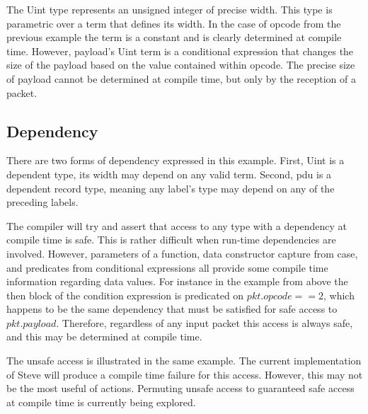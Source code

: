 The Uint type represents an unsigned integer of precise width. This type is 
parametric over a term that defines its width. In the case of opcode from the
previous example the term is a constant and is clearly determined at compile
time. However, payload's Uint term is a conditional expression that changes
the size of the payload based on the value contained within opcode. The precise
size of payload cannot be determined at compile time, but only by the reception
of a packet.

\subsection{Dependency}

There are two forms of dependency expressed in this example. First, Uint is a 
dependent type, its width may depend on any valid term. Second, pdu is a
dependent record type, meaning any label's type may depend on any of the
preceding labels. 

The compiler will try and assert that access to any type with a dependency at
compile time is safe. This is rather difficult when run-time dependencies are
involved. However, parameters of a function, data constructor capture from case,
and predicates from conditional expressions all provide some compile time
information regarding data values. For instance in the example from above the 
then block of the condition expression is predicated on $pkt.opcode == 2$, which
happens to be the same dependency that must be satisfied for safe access to 
$pkt.payload$. Therefore, regardless of any input packet this access is always
safe, and this may be determined at compile time.

The unsafe access is illustrated in the same example. The current implementation
of Steve will produce a compile time failure for this access. However, this may
not be the most useful of actions. Permuting unsafe access to guaranteed safe
access at compile time is currently being explored.
